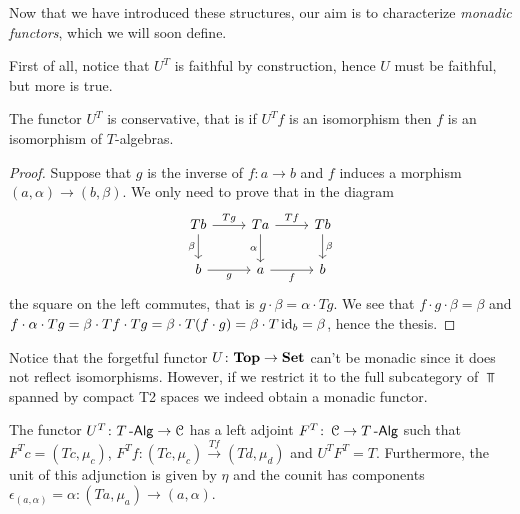 \documentclass[a4paper,11pt,oneside,openany]{scrbook}
\begin{document}
Now that we have introduced these structures, our aim is to characterize
\emph{monadic functors}, which we will soon define.

First of all, notice that $U^T$ is faithful by construction, hence $U$ must be faithful, but more is true.

\begin{lemma}
	The functor $U^T$ is conservative, that is if $U^Tf$ is an isomorphism then $f$ is an isomorphism of $T$-algebras.
\end{lemma}
\begin{proof}
	Suppose that $g$ is the inverse of $f\colon a\rightarrow b$ and $f$ induces
	a morphism $(a,\alpha)\rightarrow (b,\beta)$. We only need to prove that in
	the diagram
	\[
		\begin{tikzcd}
			Tb\arrow["\beta"']{d}\arrow["Tg"]{r}
			& Ta\arrow["\alpha"']{d}\arrow["Tf"]{r}
			& Tb\arrow["\beta"]{d} \\
			b\arrow["g"']{r}
			& a\arrow["f"']{r}
			& b
		\end{tikzcd}
	\]
	the square on the left commutes, that is $g\cdot\beta=\alpha\cdot Tg$.
	We see that $f\cdot g\cdot\beta=\beta$ and $f\cdot\alpha\cdot Tg=\beta\cdot Tf\cdot
		Tg=\beta\cdot T(f\cdot g)=\beta\cdot T\operatorname{id}_b=\beta$, hence the thesis.
\end{proof}
\begin{rmk}
	Notice that the forgetful functor $U\colon{\normalfont\textbf{Top}}\to{\normalfont\textbf{Set}}$ can't be monadic
	since it does not reflect isomorphisms. However, if we restrict it to
	the full subcategory of $\Top$ spanned by compact T2 spaces we indeed
	obtain a monadic functor.
\end{rmk}
\begin{prop}
	The functor $U^T\colon T\operatorname{-\mathsf{Alg}}\rightarrow\operatorname{\mathcal{C}}$ has a left adjoint $F^T\colon\operatorname{\mathcal{C}}\rightarrow T\operatorname{-\mathsf{Alg}}$ such that $F^Tc=(Tc,\mu_{c})$, $F^Tf\colon(Tc,\mu_{c})\xrightarrow{Tf} (Td,\mu_{d})$ and $U^TF^T=T$. Furthermore, the unit of this adjunction is given by $\eta$ and the counit has components $\epsilon_{(a,\alpha)}=\alpha\colon(Ta,\mu_a)\to(a,\alpha)$.
\end{prop}
\end{document}
